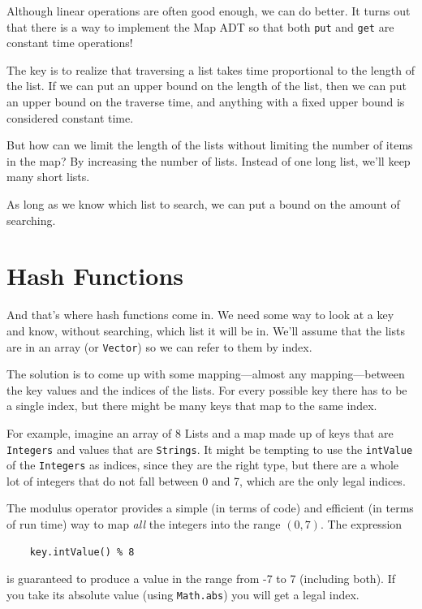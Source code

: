 \documentclass[12pt]{book}
\theoremstyle{exercise}
\begin{document}
Although linear operations are often good enough, we can do
better.  It turns out that there is a way to implement the
Map ADT so that both {\tt put} and {\tt get} are constant time
operations!

The key is to realize that traversing a list takes time
proportional to the length of the list.  If we can put an upper
bound on the length of the list, then we can put an upper
bound on the traverse time, and anything with a fixed upper
bound is considered constant time.


But how can we limit the length of the lists without limiting
the number of items in the map?  By increasing the number
of lists.  Instead of one long list, we'll keep many short
lists.

As long as we know which list to search, we can put a bound
on the amount of searching.


\section{Hash Functions}

And that's where hash functions come in.  We need some way to look at
a key and know, without searching, which list it will be in.  We'll
assume that the lists are in an array (or {\tt Vector}) so we can
refer to them by index.

The solution is to come up with some mapping---almost any
mapping---between the key values and the indices of the lists.
For every possible key there has to be a single index, but
there might be many keys that map to the same index.

For example, imagine an array of 8 Lists and a map made
up of keys that are {\tt Integers} and values that are
{\tt Strings}.  It might be tempting to use the
{\tt intValue} of the {\tt Integers} as indices, since they
are the right type, but there are a whole lot of integers
that do not fall between 0 and 7, which are the only legal
indices.


The modulus operator provides a simple
(in terms of code) and efficient (in terms of run time) way
to map {\em all} the integers into the range $(0, 7)$.
The expression

\begin{verbatim}
    key.intValue() % 8
\end{verbatim}
%
is guaranteed to produce a value in the range from -7 to 7 (including
both).  If you take its absolute value (using {\tt Math.abs}) you
will get a legal index.
\end{document}
